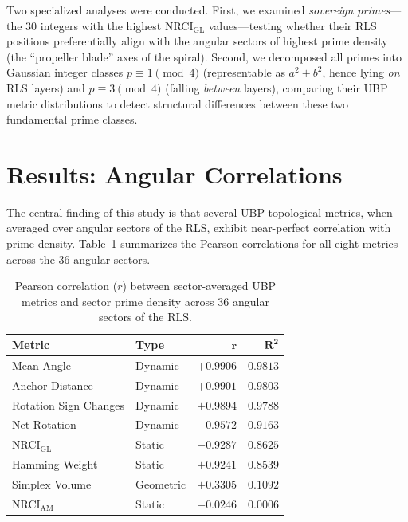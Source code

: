 \documentclass[11pt,a4paper]{article}
\theoremstyle{definition}
\begin{document}
Two specialized analyses were conducted. First, we examined \emph{sovereign primes}---the 30 integers with the highest NRCI$_{\text{GL}}$ values---testing whether their RLS positions preferentially align with the angular sectors of highest prime density (the ``propeller blade'' axes of the spiral). Second, we decomposed all primes into Gaussian integer classes $p \equiv 1 \pmod{4}$ (representable as $a^2 + b^2$, hence lying \emph{on} RLS layers) and $p \equiv 3 \pmod{4}$ (falling \emph{between} layers), comparing their UBP metric distributions to detect structural differences between these two fundamental prime classes.

\section{Results: Angular Correlations}\label{sec:results_angular}

The central finding of this study is that several UBP topological metrics, when averaged over angular sectors of the RLS, exhibit near-perfect correlation with prime density. Table~\ref{tab:angular_corr} summarizes the Pearson correlations for all eight metrics across the 36 angular sectors.

\begin{table}[htbp]
\centering
\caption{Pearson correlation ($r$) between sector-averaged UBP metrics and sector prime density across 36 angular sectors of the RLS.}\label{tab:angular_corr}
\begin{tabularx}{0.92\textwidth}{lXrr}
\toprule
\textbf{Metric} & \textbf{Type} & $\boldsymbol{r}$ & $\boldsymbol{R^2}$ \\
\midrule
Mean Angle              & Dynamic   & $+0.9906$ & $0.9813$ \\
Anchor Distance         & Dynamic   & $+0.9901$ & $0.9803$ \\
Rotation Sign Changes   & Dynamic   & $+0.9894$ & $0.9788$ \\
Net Rotation            & Dynamic   & $-0.9572$ & $0.9163$ \\
NRCI$_{\text{GL}}$     & Static    & $-0.9287$ & $0.8625$ \\
Hamming Weight          & Static    & $+0.9241$ & $0.8539$ \\
Simplex Volume          & Geometric & $+0.3305$ & $0.1092$ \\
NRCI$_{\text{AM}}$      & Static    & $-0.0246$ & $0.0006$ \\
\bottomrule
\end{tabularx}
\end{table}
\end{document}
